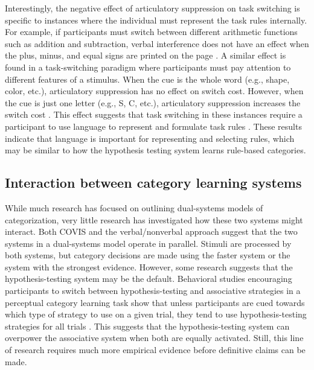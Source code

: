\documentclass[../dissertation.tex]{subfiles}
\begin{document}
	Interestingly, the negative effect of articulatory suppression on task switching is specific to instances where the individual must represent the task rules internally. For example, if participants must switch between different arithmetic functions such as addition and subtraction, verbal interference does not have an effect when the plus, minus, and equal signs are printed on the page \citet{Baddeley2001}. A similar effect is found in a task-switching paradigm where participants must pay attention to different features of a stimulus. When the cue is the whole word (e.g., shape, color, etc.), articulatory suppression has no effect on switch cost. However, when the cue is just one letter (e.g., S, C, etc.), articulatory suppression increases the switch cost \citep{Miyake2004}. This effect suggests that task switching in these instances require a participant to use language to represent and formulate task rules \citep{Cragg2010}. These results indicate that language is important for representing and selecting rules, which may be similar to how the hypothesis testing system learns rule-based categories. 
	
\subsection{Interaction between category learning systems}

While much research has focused on outlining dual-systems models of categorization, very little research has investigated how these two systems might interact. Both  COVIS and the verbal/nonverbal approach suggest that the two systems in a dual-systems model operate in parallel. Stimuli are processed by both systems, but category decisions are made using the faster system or the system with the strongest evidence. However, some research suggests that the hypothesis-testing system may be the default. Behavioral studies encouraging participants to switch between hypothesis-testing and associative strategies in a perceptual category learning task show that unless participants are cued towards which type of strategy to use on a given trial, they tend to use hypothesis-testing strategies for all trials \citep{Ashby2010, Erickson2008}. This suggests that the hypothesis-testing system can overpower the associative system when both are equally activated. Still, this line of research requires much more empirical evidence before definitive claims can be made.
\end{document}
